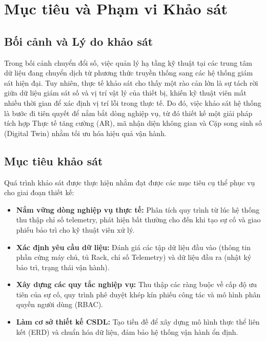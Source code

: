 \section{Mục tiêu và Phạm vi Khảo sát}

\subsection{Bối cảnh và Lý do khảo sát}
Trong bối cảnh chuyển đổi số, việc quản lý hạ tầng kỹ thuật tại các trung tâm dữ liệu đang chuyển dịch từ phương thức truyền thống sang các hệ thống giám sát hiện đại. Tuy nhiên, thực tế khảo sát cho thấy một rào cản lớn là sự tách rời giữa dữ liệu giám sát số và vị trí vật lý của thiết bị, khiến kỹ thuật viên mất nhiều thời gian để xác định vị trí lỗi trong thực tế. Do đó, việc khảo sát hệ thống là bước đi tiên quyết để nắm bắt dòng nghiệp vụ, từ đó thiết kế một giải pháp tích hợp Thực tế tăng cường (AR), mã nhận diện không gian và Cặp song sinh số (Digital Twin) nhằm tối ưu hóa hiệu quả vận hành.

\subsection{Mục tiêu khảo sát}
Quá trình khảo sát được thực hiện nhằm đạt được các mục tiêu cụ thể phục vụ cho giai đoạn thiết kế:
\begin{itemize}[leftmargin=2em]
    \item \textbf{Nắm vững dòng nghiệp vụ thực tế:} Phân tích quy trình từ lúc hệ thống thu thập chỉ số telemetry, phát hiện bất thường cho đến khi tạo sự cố và giao phiếu bảo trì cho kỹ thuật viên xử lý.
    \item \textbf{Xác định yêu cầu dữ liệu:} Đánh giá các tập dữ liệu đầu vào (thông tin phần cứng máy chủ, tủ Rack, chỉ số Telemetry) và dữ liệu đầu ra (nhật ký bảo trì, trạng thái vận hành).
    \item \textbf{Xây dựng các quy tắc nghiệp vụ:} Thu thập các ràng buộc về cấp độ ưu tiên của sự cố, quy trình phê duyệt khép kín phiếu công tác và mô hình phân quyền người dùng (RBAC).
    \item \textbf{Làm cơ sở thiết kế CSDL:} Tạo tiền đề để xây dựng mô hình thực thể liên kết (ERD) và chuẩn hóa dữ liệu, đảm bảo hệ thống vận hành ổn định.
\end{itemize}

